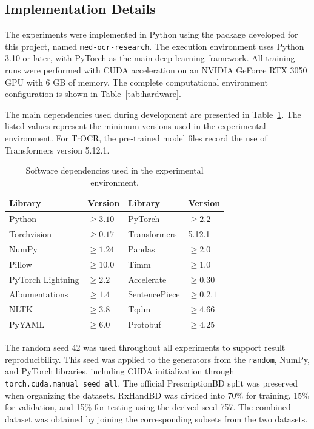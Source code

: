 \documentclass[11pt,a4paper]{article}
\begin{document}
\subsection{Implementation Details}
\label{sec:implementation}

The experiments were implemented in Python using the package developed for this
project, named \texttt{med-ocr-research}. The execution environment uses Python
3.10 or later, with PyTorch as the main deep learning framework. All training
runs were performed with CUDA acceleration on an NVIDIA GeForce RTX 3050 GPU
with 6 GB of memory. The complete computational environment configuration is
shown in Table~\ref{tab:hardware}.

The main dependencies used during development are presented in
Table~\ref{tab:software}. The listed values represent the minimum versions used
in the experimental environment. For TrOCR, the pre-trained model files record
the use of Transformers version 5.12.1.

\begin{table}[htbp]
	\centering
	\caption{Software dependencies used in the experimental environment.}
	\label{tab:software}
	\begin{tabular}{llll}
		\toprule
		\textbf{Library} & \textbf{Version} &
		\textbf{Library} & \textbf{Version} \\
		\midrule
		Python            & $\geq 3.10$   & PyTorch          & $\geq 2.2$  \\
		Torchvision       & $\geq 0.17$   & Transformers     & 5.12.1       \\
		NumPy             & $\geq 1.24$   & Pandas           & $\geq 2.0$  \\
		Pillow            & $\geq 10.0$   & Timm             & $\geq 1.0$  \\
		PyTorch Lightning & $\geq 2.2$    & Accelerate       & $\geq 0.30$ \\
		Albumentations    & $\geq 1.4$    & SentencePiece    & $\geq 0.2.1$ \\
		NLTK              & $\geq 3.8$    & Tqdm             & $\geq 4.66$ \\
		PyYAML            & $\geq 6.0$    & Protobuf         & $\geq 4.25$ \\
		\bottomrule
	\end{tabular}
\end{table}

The random seed 42 was used throughout all experiments to support result
reproducibility. This seed was applied to the generators from the
\texttt{random}, NumPy, and PyTorch libraries, including CUDA initialization
through \texttt{torch.cuda.manual\_seed\_all}. The official PrescriptionBD split
was preserved when organizing the datasets. RxHandBD was divided into 70\% for
training, 15\% for validation, and 15\% for testing using the derived seed 757.
The combined dataset was obtained by joining the corresponding subsets from the
two datasets.
\end{document}
